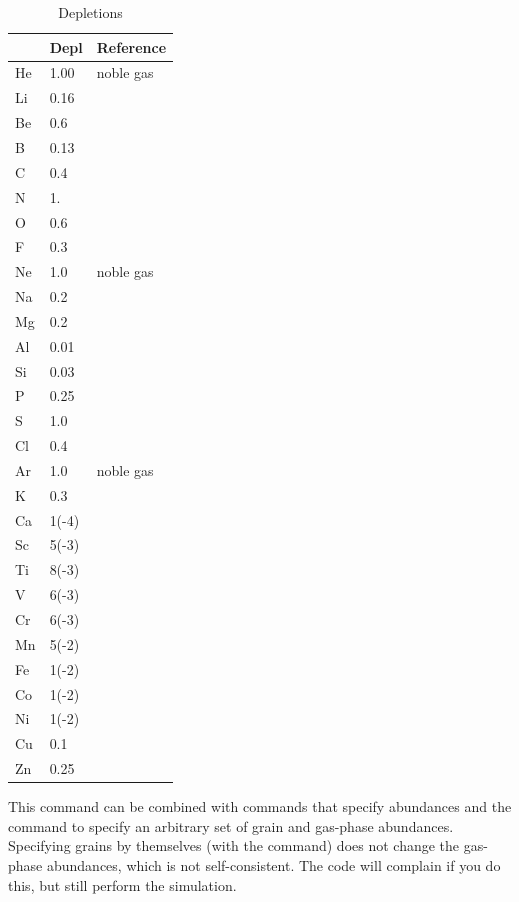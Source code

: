 \begin{table}
\centering
\caption{Depletions}
\label{tab:GrainGasDepletionFactors}
\begin{tabular}{lll}\hline
&Depl& Reference\\
\hline
He& 1.00& noble gas\\
Li& 0.16& \citealp{White1986}\\
Be& 0.6& \citealp{York1982}\\
B& 0.13& \citealp{Federman1993}\\
C& 0.4\\
N& 1.\\
O& 0.6\\
F& 0.3& \citealp{Snow1981}\\
Ne& 1.0& noble gas\\
Na& 0.2\\
Mg& 0.2\\
Al& 0.01\\
Si& 0.03\\
P& 0.25& \citealp{Cardelli1991}\\
S& 1.0\\
Cl& 0.4\\
Ar&1.0& noble gas\\
K& 0.3& \citealp{Chaffee1982}\\
Ca& 1(-4)\\
Sc& 5(-3)& \citealp{Snow1980}\\
Ti& 8(-3)& \citealp{Crinklaw1994}\\
V& 6(-3)& \citealp{Cardelli1994}\\
Cr& 6(-3)& \citealp{Cardelli1991}\\
Mn& 5(-2)& \citealp{Cardelli1991}\\
Fe& 1(-2)\\
Co& 1(-2)\\
Ni& 1(-2)\\
Cu& 0.1& \citealp{Cardelli1991}\\
Zn& 0.25& \citealp{Cardelli1991}\\
\hline
\end{tabular}
\end{table}

This command can be combined with commands that specify abundances
and the  command to specify an arbitrary set of
grain and gas-phase abundances.
Specifying grains by themselves (with the  command)
does not change the gas-phase abundances,
which is not self-consistent.  The
code will complain if you do this, but still perform the simulation.

